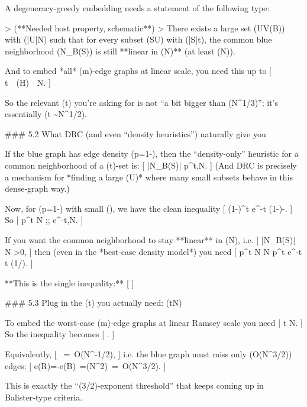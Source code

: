 A degeneracy‑greedy embedding needs a statement of the following type:

> (**Needed host property, schematic**)
> There exists a large set (U\subseteq V(B)) with (|U|\asymp N) such that for every subset (S\subseteq U) with (|S|\le t), the common blue neighborhood (N_B(S)) is still **linear in (N)** (at least (\asymp N)).

And to embed *all* (m)-edge graphs at linear scale, you need this up to
[
t\ \gtrsim\ (H)\ \asymp\ \sqrt N.
]

So the relevant (t) you’re asking for is not “a bit bigger than (N^{1/3})”; it’s essentially (t \sim N^{1/2}).

### 5.2 What DRC (and even “density heuristics”) naturally give you

If the blue graph has edge density (p=1-\varepsilon), then the “density‑only” heuristic for a common neighborhood of a (t)-set is:
[
|N_B(S)| \approx p^{t},N.
]
(And DRC is precisely a mechanism for *finding a large (U)* where many small subsets behave in this dense‑graph way.)

Now, for (p=1-\varepsilon) with small (\varepsilon), we have the clean inequality
[
(1-\varepsilon)^t \le e^{-\varepsilon t}
\quad{}\ln(1-\varepsilon)\le -\varepsilon\text{)}.
]
So
[
p^{t} N ;\le; e^{-\varepsilon t},N.
]

If you want the common neighborhood to stay **linear** in (N), i.e.
[
|N_B(S)| \ge \alpha N \quad{}\alpha>0,
]
then (even in the *best‑case density model*) you need
[
p^t N \gtrsim \alpha N
\quad\Longrightarrow\quad
p^t \gtrsim \alpha
\quad\Longrightarrow\quad
e^{-\varepsilon t}\gtrsim \alpha
\quad\Longrightarrow\quad
\varepsilon t \lesssim \log(1/\alpha).
]

**This is the single inequality:**
[
\qquad{}
]

### 5.3 Plug in the (t) you actually need: (t\asymp \sqrt N)

To embed the worst‑case (m)-edge graphs at linear Ramsey scale you need
[
t \asymp \sqrt N.
]
So the inequality becomes
[
.
]

Equivalently,
[
\varepsilon \ =\ O(N^{-1/2}),
]
i.e. the blue graph must miss only (O(N^{3/2})) edges:
[
e(R)=-e(B)\ =\Theta(\varepsilon N^2)\ =\ O(N^{3/2}).
]

This is exactly the “(3/2)-exponent threshold” that keeps coming up in Balister‑type criteria.

